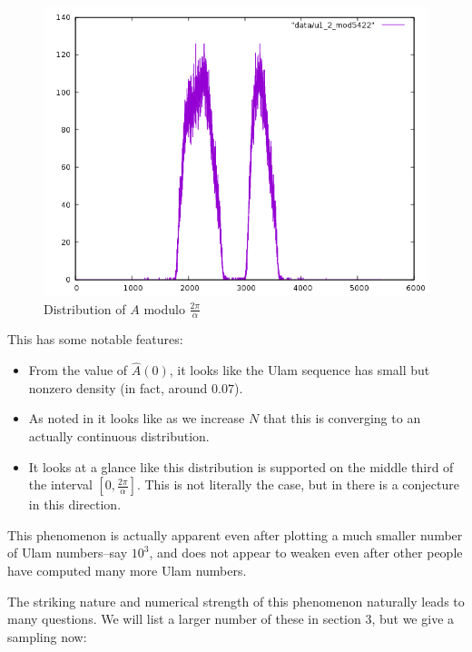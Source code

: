 \documentclass{report}
\theoremstyle{remark}
\numberwithin{equation}{section}
\begin{document}
\begin{figure}
\caption{Distribution of $A$ modulo $\frac{2\pi}{\alpha}$}\label{fig:intro_dist}
\begin{center}
\includegraphics[scale=0.5]{../figs/u1_2_mod5422.png}
\end{center}
\end{figure}

This has some notable features: 

\begin{itemize}
\item From the value of $\widehat{A}(0)$, it looks like the Ulam
  sequence has small but nonzero density (in fact, around $0.07$).

\item As noted in \cite{steinerberger:preprint} it looks like as we increase $N$
  that this is converging to an actually continuous distribution.

\item It looks at a glance like this distribution is supported on the
  middle third of the interval $[0,\frac{2\pi}\alpha]$.  This is not
  literally the case, but in \cite{gibbs:preprint} there is a
  conjecture in this direction.
\end{itemize}

This phenomenon is actually apparent even after plotting a much
smaller number of Ulam numbers--say $10^3$, and does not appear to
weaken even after other people have computed many more Ulam numbers.

The striking nature and numerical strength of this phenomenon
naturally leads to many questions.  We will list a larger number of
these in section 3, but we give a sampling now: 
\end{document}

